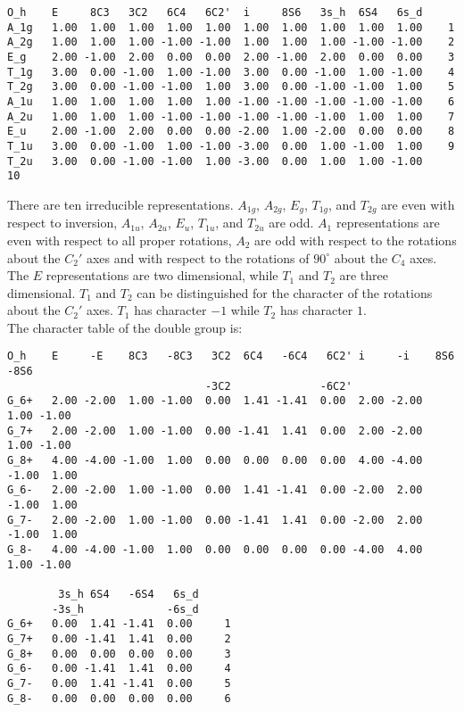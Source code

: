 \documentclass[12pt,a4paper,twoside]{report}
\begin{document}
\begin{tcolorbox}
\begin{footnotesize}
\begin{verbatim}
O_h    E     8C3   3C2   6C4   6C2'  i     8S6   3s_h  6S4   6s_d 
A_1g   1.00  1.00  1.00  1.00  1.00  1.00  1.00  1.00  1.00  1.00    1
A_2g   1.00  1.00  1.00 -1.00 -1.00  1.00  1.00  1.00 -1.00 -1.00    2
E_g    2.00 -1.00  2.00  0.00  0.00  2.00 -1.00  2.00  0.00  0.00    3
T_1g   3.00  0.00 -1.00  1.00 -1.00  3.00  0.00 -1.00  1.00 -1.00    4
T_2g   3.00  0.00 -1.00 -1.00  1.00  3.00  0.00 -1.00 -1.00  1.00    5
A_1u   1.00  1.00  1.00  1.00  1.00 -1.00 -1.00 -1.00 -1.00 -1.00    6
A_2u   1.00  1.00  1.00 -1.00 -1.00 -1.00 -1.00 -1.00  1.00  1.00    7
E_u    2.00 -1.00  2.00  0.00  0.00 -2.00  1.00 -2.00  0.00  0.00    8
T_1u   3.00  0.00 -1.00  1.00 -1.00 -3.00  0.00  1.00 -1.00  1.00    9
T_2u   3.00  0.00 -1.00 -1.00  1.00 -3.00  0.00  1.00  1.00 -1.00    10
\end{verbatim}
\end{footnotesize}
\end{tcolorbox}

There are ten irreducible representations. $A_{1g}$, $A_{2g}$, $E_g$,
$T_{1g}$, and $T_{2g}$ are even with respect to inversion, $A_{1u}$, 
$A_{2u}$, $E_u$, $T_{1u}$, and $T_{2u}$ are odd. $A_1$ representations are even
with respect to all proper rotations, $A_2$ are odd with respect to
the rotations about the $C_2'$ axes and with respect to the rotations
of $90^\circ$ about the $C_4$ axes. The $E$ representations are two
dimensional, while $T_1$ and $T_2$ are three dimensional. $T_1$ and $T_2$
can be distinguished for the character of the rotations about the $C_2'$
axes. $T_1$ has character $-1$ while $T_2$ has character $1$. \\
The character table of the double group is:

\begin{tcolorbox}
\begin{scriptsize}
\begin{verbatim}
O_h    E     -E    8C3   -8C3   3C2  6C4   -6C4   6C2' i     -i    8S6   -8S6 
                               -3C2              -6C2'                        
G_6+   2.00 -2.00  1.00 -1.00  0.00  1.41 -1.41  0.00  2.00 -2.00  1.00 -1.00
G_7+   2.00 -2.00  1.00 -1.00  0.00 -1.41  1.41  0.00  2.00 -2.00  1.00 -1.00
G_8+   4.00 -4.00 -1.00  1.00  0.00  0.00  0.00  0.00  4.00 -4.00 -1.00  1.00
G_6-   2.00 -2.00  1.00 -1.00  0.00  1.41 -1.41  0.00 -2.00  2.00 -1.00  1.00
G_7-   2.00 -2.00  1.00 -1.00  0.00 -1.41  1.41  0.00 -2.00  2.00 -1.00  1.00
G_8-   4.00 -4.00 -1.00  1.00  0.00  0.00  0.00  0.00 -4.00  4.00  1.00 -1.00

        3s_h 6S4   -6S4   6s_d
       -3s_h             -6s_d
G_6+   0.00  1.41 -1.41  0.00     1
G_7+   0.00 -1.41  1.41  0.00     2
G_8+   0.00  0.00  0.00  0.00     3
G_6-   0.00 -1.41  1.41  0.00     4
G_7-   0.00  1.41 -1.41  0.00     5
G_8-   0.00  0.00  0.00  0.00     6
\end{verbatim}
\end{scriptsize}
\end{tcolorbox}
\end{document}

